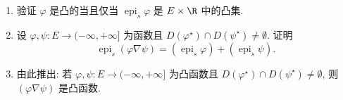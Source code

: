 \begin{exercise}[下卷积.]
\begin{enumerate}[label=\arabic*., leftmargin=2.2em, itemsep=0.25em, start=5]
	\item 验证 $\varphi$ 是凸的当且仅当 $\operatorname{epi}_{s}\varphi$ 是 $E\times\R$ 中的凸集.
	\item 设 $\varphi,\psi:E\to(-\infty,+\infty]$ 为函数且 $D(\varphi^\star)\cap D(\psi^\star)\ne\emptyset$.
	      证明
	      \begin{equation*}
	      \operatorname{epi}_{s}(\varphi\nabla\psi)
	      =(\operatorname{epi}_{s}\varphi)+(\operatorname{epi}_{s}\psi).
	      \end{equation*}
	\item 由此推出: 若 $\varphi,\psi:E\to(-\infty,+\infty]$ 为凸函数且
	      $D(\varphi^\star)\cap D(\psi^\star)\ne\emptyset$, 则 $(\varphi\nabla\psi)$ 是凸函数.
\end{enumerate}
\end{exercise}

